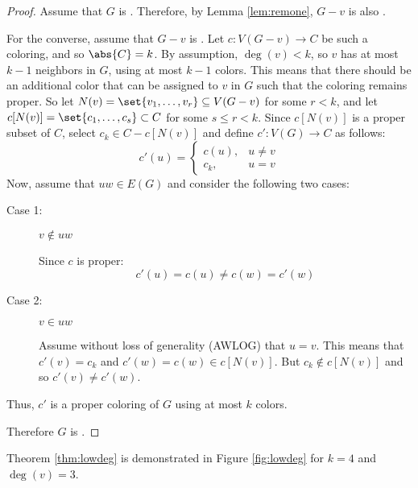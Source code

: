 \begin{proof}
  Assume that \(G\) is .  Therefore, by Lemma \ref{lem:remone}, \(G-v\) is also .

  For the converse, assume that \(G-v\) is .  Let \(c:V(G-v)\to C\) be such a coloring, and so
  \(\abs{C}=k\).  By assumption, \(\deg(v)<k\), so \(v\) has at most \(k-1\) neighbors in \(G\), using at most
  \(k-1\) colors.  This means that there should be an additional color that can be assigned to \(v\) in \(G\) such
  that the coloring remains proper.  So let \(N(v)=\set{v_1,\ldots,v_r}\subseteq V(G-v)\) for some \(r<k\), and let
  \(c[N(v)]=\set{c_1,\ldots,c_s}\subset C\) for some \(s\le r<k\).  Since \(c[N(v)]\) is a proper subset of \(C\),
  select \(c_k\in C-c[N(v)]\) and define \(c':V(G)\to C\) as follows:
  \[c'(u)=\begin{cases}
  c(u), & u\ne v \\
  c_k, & u=v
  \end{cases}\]
  Now, assume that \(uw\in E(G)\) and consider the following two cases:
  \begin{description}
  \item[Case 1:] \(v\notin uw\)

    Since \(c\) is proper:
    \[c'(u)=c(u)\ne c(w)=c'(w)\]
  \item[Case 2:] \(v\in uw\)

    Assume without loss of generality (AWLOG) that \(u=v\).  This means that \(c'(v)=c_k\) and \(c'(w)=c(w)\in
    c[N(v)]\).  But \(c_k\notin c[N(v)]\) and so \(c'(v)\ne c'(w)\).
  \end{description}
  Thus, \(c'\) is a proper coloring of \(G\) using at most \(k\) colors.

  Therefore \(G\) is .
\end{proof}

Theorem \ref{thm:lowdeg} is demonstrated in Figure \ref{fig:lowdeg} for \(k=4\) and \(\deg(v)=3\).

